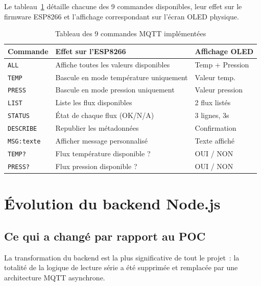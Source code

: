 \documentclass[12pt, a4paper]{report}
\begin{document}
Le tableau~\ref{tab:commandes} d\'etaille chacune des 9 commandes
disponibles, leur effet sur le firmware ESP8266 et l'affichage
correspondant sur l'\'ecran OLED physique.

\begin{table}[H]
\centering
\renewcommand{\arraystretch}{1.3}
\begin{tabularx}{\linewidth}{|l|X|l|}
\hline
\rowcolor{bleuFonce!10}
\textbf{Commande} & \textbf{Effet sur l'ESP8266} &
\textbf{Affichage OLED} \\
\hline
\texttt{ALL}       & Affiche toutes les valeurs disponibles & Temp + Pression \\
\hline
\texttt{TEMP}      & Bascule en mode temp\'erature uniquement & Valeur temp. \\
\hline
\texttt{PRESS}     & Bascule en mode pression uniquement & Valeur pression \\
\hline
\texttt{LIST}      & Liste les flux disponibles & 2 flux list\'es \\
\hline
\texttt{STATUS}    & \'Etat de chaque flux (OK/N/A) & 3 lignes, 3s \\
\hline
\texttt{DESCRIBE}  & Republier les m\'etadonn\'ees & Confirmation \\
\hline
\texttt{MSG:texte} & Afficher message personnalis\'e & Texte affich\'e \\
\hline
\texttt{TEMP?}     & Flux temp\'erature disponible ? & OUI / NON \\
\hline
\texttt{PRESS?}    & Flux pression disponible ? & OUI / NON \\
\hline
\end{tabularx}
\caption{Tableau des 9 commandes MQTT impl\'ement\'ees}
\label{tab:commandes}
\end{table}

\chapter{\'Evolution du backend Node.js}

\section{Ce qui a chang\'e par rapport au POC}

La transformation du backend est la plus significative de tout le
projet~: la totalit\'e de la logique de lecture s\'erie a \'et\'e
supprim\'ee et remplac\'ee par une architecture MQTT asynchrone.
\end{document}
